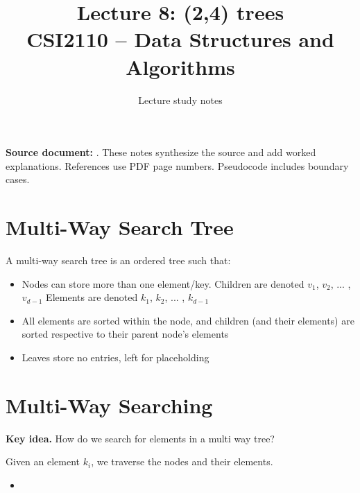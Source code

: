 \documentclass[11pt,letterpaper]{article}
\title{\textbf{Lecture 8: (2,4) trees}\\\large CSI2110 -- Data Structures and Algorithms}\author{Lecture study notes}\date{}
\newcommand{\keyidea}[1]{\par\textbf{Key idea.} #1\par}
\begin{document}
\maketitle
\textbf{Source document:} . These notes synthesize the source and add worked explanations. References use PDF page numbers. Pseudocode includes boundary cases.
\tableofcontents\newpage

\section{Multi-Way Search Tree}
A multi-way search tree is an ordered tree such that:
\begin{itemize}
    \item Nodes can store more than one element/key.
    \subitem Children are denoted $v_1$, $v_2$, ... , $v_{d-1}$ 
    \subitem Elements are denoted $k_1$, $k_2$, ... , $k_{d-1}$
    \item All elements are sorted within the node, and children (and their elements) are sorted respective to their parent node's elements 
    \item Leaves store no entries, left for placeholding
\end{itemize}

\section{Multi-Way Searching}
\keyidea{How do we search for elements in a multi way tree?}
Given an element $k_i$, we traverse the nodes and their elements.
\begin{itemize}
    \item 
\end{itemize}
\end{document}
